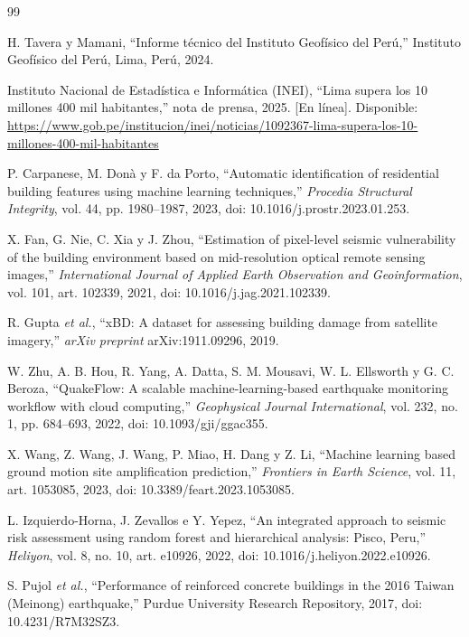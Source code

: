 \documentclass[conference]{IEEEtran}%
\begin{document}
\begin{thebibliography}{99}
\footnotesize

H. Tavera y Mamani, ``Informe técnico del Instituto Geofísico del Perú,'' Instituto Geofísico del Perú, Lima, Perú, 2024.

Instituto Nacional de Estadística e Informática (INEI), ``Lima supera los 10 millones 400 mil habitantes,'' nota de prensa, 2025. [En línea]. Disponible: \url{https://www.gob.pe/institucion/inei/noticias/1092367-lima-supera-los-10-millones-400-mil-habitantes}

P. Carpanese, M. Donà y F. da Porto, ``Automatic identification of residential building features using machine learning techniques,'' \emph{Procedia Structural Integrity}, vol. 44, pp. 1980--1987, 2023, doi: 10.1016/j.prostr.2023.01.253.

X. Fan, G. Nie, C. Xia y J. Zhou, ``Estimation of pixel-level seismic vulnerability of the building environment based on mid-resolution optical remote sensing images,'' \emph{International Journal of Applied Earth Observation and Geoinformation}, vol. 101, art. 102339, 2021, doi: 10.1016/j.jag.2021.102339.

R. Gupta \emph{et al.}, ``xBD: A dataset for assessing building damage from satellite imagery,'' \emph{arXiv preprint} arXiv:1911.09296, 2019.

W. Zhu, A. B. Hou, R. Yang, A. Datta, S. M. Mousavi, W. L. Ellsworth y G. C. Beroza, ``QuakeFlow: A scalable machine-learning-based earthquake monitoring workflow with cloud computing,'' \emph{Geophysical Journal International}, vol. 232, no. 1, pp. 684--693, 2022, doi: 10.1093/gji/ggac355.

X. Wang, Z. Wang, J. Wang, P. Miao, H. Dang y Z. Li, ``Machine learning based ground motion site amplification prediction,'' \emph{Frontiers in Earth Science}, vol. 11, art. 1053085, 2023, doi: 10.3389/feart.2023.1053085.

L. Izquierdo-Horna, J. Zevallos e Y. Yepez, ``An integrated approach to seismic risk assessment using random forest and hierarchical analysis: Pisco, Peru,'' \emph{Heliyon}, vol. 8, no. 10, art. e10926, 2022, doi: 10.1016/j.heliyon.2022.e10926.

S. Pujol \emph{et al.}, ``Performance of reinforced concrete buildings in the 2016 Taiwan (Meinong) earthquake,'' Purdue University Research Repository, 2017, doi: 10.4231/R7M32SZ3.


\end{thebibliography}
\end{document}
